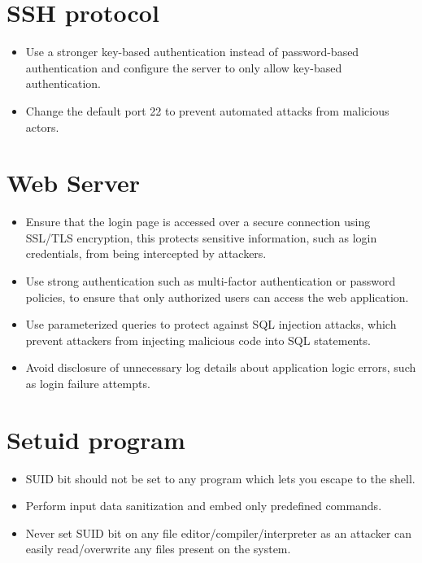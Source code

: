 \documentclass[a4paper, 12pt, oneside]{extbook}
\begin{document}
\section*{SSH protocol}
\begin{itemize}
  \item Use a stronger key-based authentication instead of password-based authentication and configure the server to only allow key-based authentication.
  \item Change the default port 22 to prevent automated attacks from malicious actors.
 \end{itemize}

 \section*{Web Server}
\begin{itemize}
  \item Ensure that the login page is accessed over a secure connection using SSL/TLS encryption, this protects sensitive information, such as login credentials, from being intercepted by attackers.
  \item Use strong authentication such as multi-factor authentication or password policies, to ensure that only authorized users can access the web application.
  \item Use parameterized queries to protect against SQL injection attacks, which prevent attackers from injecting malicious code into SQL statements.
  \item Avoid disclosure of unnecessary log details about application logic errors, such as login failure attempts.
\end{itemize}

\section*{Setuid program}
\begin{itemize}
\item SUID bit should not be set to any program which lets you escape to the shell.
\item Perform input data sanitization and embed only predefined commands.
\item Never set SUID bit on any file editor/compiler/interpreter as an attacker can easily read/overwrite any files present on the system.
\end{itemize}
\end{document}
